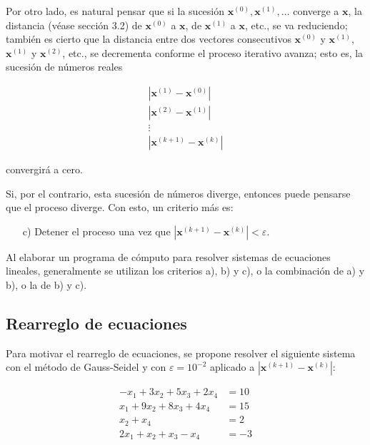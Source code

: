 \documentclass[12pt,letterpaper]{article}
\theoremstyle{definition}
\theoremstyle{plain}
\theoremstyle{remark}
\begin{document}
Por otro lado, es natural pensar que si la sucesión $\mathbf{x}^{(0)}, \mathbf{x}^{(1)}, \ldots$ converge a $\mathbf{x}$, la distancia (véase sección 3.2) de $\mathbf{x}^{(0)}$ a $\mathbf{x}$, de $\mathbf{x}^{(1)}$ a $\mathbf{x}$, etc., se va reduciendo; también es cierto que la distancia entre dos vectores consecutivos $\mathbf{x}^{(0)}$ y $\mathbf{x}^{(1)}$, $\mathbf{x}^{(1)}$ y $\mathbf{x}^{(2)}$, etc., se decrementa conforme el proceso iterativo avanza; esto es, la sucesión de números reales

\begin{equation}
\begin{aligned}
|\mathbf{x}^{(1)} - \mathbf{x}^{(0)}| \\
|\mathbf{x}^{(2)} - \mathbf{x}^{(1)}| \\
\vdots \\
|\mathbf{x}^{(k+1)} - \mathbf{x}^{(k)}|
\end{aligned}
\label{eq:3.95}
\tag{15}
\end{equation}

\noindent
convergirá a cero.

Si, por el contrario, esta sucesión de números diverge, entonces puede pensarse que el proceso diverge. Con esto, un criterio más es:

\begin{enumerate}
    \item[c)] Detener el proceso una vez que $|\mathbf{x}^{(k+1)} - \mathbf{x}^{(k)}| < \varepsilon$.
\end{enumerate}

Al elaborar un programa de cómputo para resolver sistemas de ecuaciones lineales, generalmente se utilizan los criterios a), b) y c), o la combinación de a) y b), o la de b) y c).

\subsection{Rearreglo de ecuaciones}

Para motivar el rearreglo de ecuaciones, se propone resolver el siguiente sistema con el método de Gauss-Seidel y con $\varepsilon = 10^{-2}$ aplicado a $|\mathbf{x}^{(k+1)} - \mathbf{x}^{(k)}|$:

\begin{equation}
\begin{aligned}
- x_1 + 3x_2 + 5x_3 + 2x_4 &= 10 \\
x_1 + 9x_2 + 8x_3 + 4x_4 &= 15 \\
x_2 + x_4 &= 2 \\
2x_1 + x_2 + x_3 - x_4 &= -3
\end{aligned}
\label{eq:3.96}
\tag{16}
\end{equation}
\end{document}
